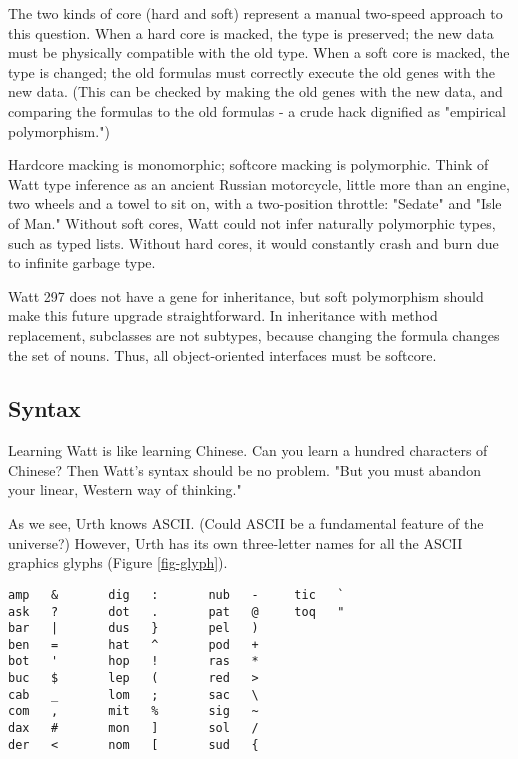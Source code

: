\documentclass[10pt, nocopyrightspace]{sigplanconf}
\begin{document}
The two kinds of core (hard and soft) represent a manual
two-speed approach to this question.  When a hard core is macked,
the type is preserved; the new data must be physically compatible
with the old type.  When a soft core is macked, the type is
changed; the old formulas must correctly execute the old genes
with the new data.  (This can be checked by making the old genes
with the new data, and comparing the formulas to the old formulas -
a crude hack dignified as "empirical polymorphism.")

Hardcore macking is monomorphic; softcore macking is polymorphic.
Think of Watt type inference as an ancient Russian motorcycle,
little more than an engine, two wheels and a towel to sit on,
with a two-position throttle: "Sedate" and "Isle of Man."
Without soft cores, Watt could not infer naturally polymorphic
types, such as typed lists.  Without hard cores, it would
constantly crash and burn due to infinite garbage type.

Watt 297 does not have a gene for inheritance, but soft
polymorphism should make this future upgrade straightforward.  In
inheritance with method replacement, subclasses are not subtypes,
because changing the formula changes the set of nouns.  Thus, all
object-oriented interfaces must be softcore.

\subsection{Syntax}

Learning Watt is like learning Chinese.  Can you learn a hundred
characters of Chinese?  Then Watt's syntax should be no problem.
"But you must abandon your linear, Western way of thinking."

As we see, Urth knows ASCII.  (Could ASCII be a fundamental
feature of the universe?)  However, Urth has its own three-letter
names for all the ASCII graphics glyphs (Figure \ref{fig-glyph}).

\begin{figure*}
\begin{center}
\makebox[\textwidth]{\hrulefill}
\begin{verbatim}
amp   &       dig   :       nub   -     tic   `
ask   ?       dot   .       pat   @     toq   "
bar   |       dus   }       pel   )
ben   =       hat   ^       pod   +
bot   '       hop   !       ras   *
buc   $       lep   (       red   >
cab   _       lom   ;       sac   \
com   ,       mit   %       sig   ~
dax   #       mon   ]       sol   /
der   <       nom   [       sud   {
\end{verbatim}
\end{center}
\caption{Urth glyphs}
\label{fig-glyph}
\end{figure*}
\end{document}
